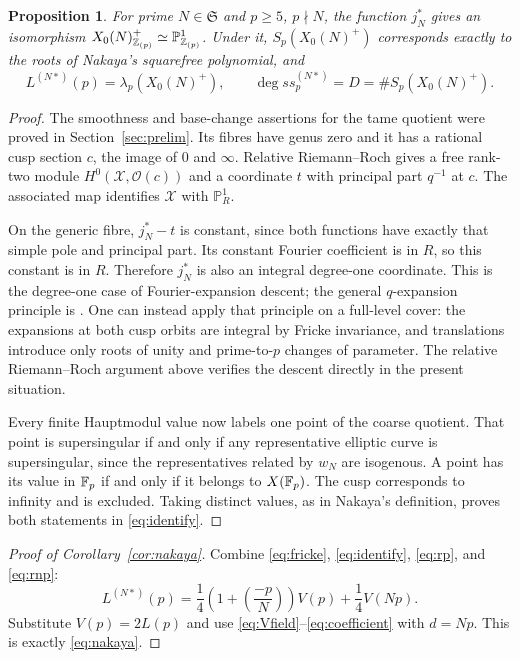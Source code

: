 \documentclass[11pt,a4paper]{article}
\newtheorem{proposition}[theorem]{Proposition}
\theoremstyle{remark}\newtheorem{remark}[theorem]{Remark}
\numberwithin{equation}{section}
\newcommand{\leg}[2]{\left(\frac{#1}{#2}\right)}
\begin{document}
	\begin{proposition}\label{prop:coordinate}
		For prime $N\in\mathfrak S$ and $p\geq5$, $p\nmid N$, the function $j_N^*$ gives an isomorphism $X_0(N)^+_{\mathbb Z_{(p)}}\simeq\mathbb P^1_{\mathbb Z_{(p)}}$. Under it, $S_p(X_0(N)^+)$ corresponds exactly to the roots of Nakaya's squarefree polynomial, and
		\begin{equation}\label{eq:identify}
			L^{(N*)}(p)=\lambda_p(X_0(N)^+),\qquad \deg ss_p^{(N*)}=D=\#S_p(X_0(N)^+).
		\end{equation}
	\end{proposition}
	\begin{proof}
		The smoothness and base-change assertions for the tame quotient were proved in Section~\ref{sec:prelim}. Its fibres have genus zero and it has a rational cusp section $c$, the image of $0$ and $\infty$. Relative Riemann--Roch gives a free rank-two module $H^0(\mathscr X,\mathcal O(c))$ and a coordinate $t$ with principal part $q^{-1}$ at $c$. The associated map identifies $\mathscr X$ with $\mathbb P^1_R$.
		
		On the generic fibre, $j_N^*-t$ is constant, since both functions have exactly that simple pole and principal part. Its constant Fourier coefficient is in $R$, so this constant is in $R$. Therefore $j_N^*$ is also an integral degree-one coordinate. This is the degree-one case of Fourier-expansion descent; the general $q$-expansion principle is \cite[VII, Theorem 3.9]{DR}. One can instead apply that principle on a full-level cover: the expansions at both cusp orbits are integral by Fricke invariance, and translations introduce only roots of unity and prime-to-$p$ changes of parameter. The relative Riemann--Roch argument above verifies the descent directly in the present situation.
		
		Every finite Hauptmodul value now labels one point of the coarse quotient. That point is supersingular if and only if any representative elliptic curve is supersingular, since the representatives related by $w_N$ are isogenous. A point has its value in $\mathbb F_p$ if and only if it belongs to $X(\mathbb F_p)$. The cusp corresponds to infinity and is excluded. Taking distinct values, as in Nakaya's definition, proves both statements in \eqref{eq:identify}.
	\end{proof}
	
	\begin{proof}[Proof of Corollary~\ref{cor:nakaya}]
		Combine \eqref{eq:fricke}, \eqref{eq:identify}, \eqref{eq:rp}, and \eqref{eq:rnp}:
		\[
		L^{(N*)}(p)=\frac14\left(1+\leg{-p}{N}\right)V(p)+\frac14V(Np).
		\]
		Substitute $V(p)=2L(p)$ and use \eqref{eq:Vfield}--\eqref{eq:coefficient} with $d=Np$. This is exactly \eqref{eq:nakaya}.
	\end{proof}
	
\end{document}

